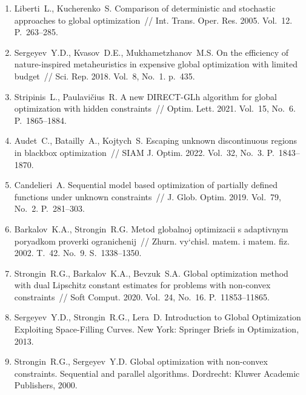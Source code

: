 \documentclass[a4paper,12pt,russian]{article}
\begin{document}
\begin{enumerate}
\item \label{rfa:enlit:Liberti2005}
Liberti~L., Kucherenko~S. Comparison of deterministic and stochastic approaches to global optimization~// Int. Trans. Oper. Res. 2005. Vol.~12. P.~263--285.

\item \label{rfa:enlit:Sergeyev2018}
Sergeyev~Y.D., Kvasov~D.E., Mukhametzhanov~M.S. On the efficiency of nature-inspired metaheuristics in expensive global optimization with limited budget~// Sci. Rep. 2018. Vol.~8, No.~1. p.~435.

\item \label{rfa:enlit:Stripinis2021}
Stripinis~L., Paulavi{\v c}ius~R. A new {DIRECT}-{GLh} algorithm for global optimization with hidden constraints~// Optim. Lett. 2021. Vol.~15, No.~6. P.~1865--1884.

\item \label{rfa:enlit:Audet2022}
Audet~C., Batailly~A., Kojtych~S. Escaping unknown discontinuous regions in blackbox optimization~// SIAM J. Optim. 2022. Vol.~32, No.~3. P.~1843--1870. %

\item \label{rfa:enlit:Candelieri2019}
Candelieri~A. Sequential model based optimization of partially defined functions
under unknown constraints~// J. Glob. Optim. 2019. Vol.~79, No.~2. P.~281--303. %

\item \label{rfa:enlit:Sergeyev2003}
Barkalov~K.A., Strongin~R.G. Metod globalnoj optimizacii s adaptivnym poryadkom proverki ogranichenij~// Zhurn. vy`chisl. matem. i matem. fiz. 2002. T.~42. No.~9. S.~1338--1350.

\item \label{rfa:enlit:Strongin2020}
Strongin~R.G., Barkalov~K.A., Bevzuk~S.A. Global optimization method with dual Lipschitz constant estimates for problems with non-convex constraints~// 
Soft Comput. 2020. Vol.~24, No.~16. P.~11853--11865. %



\item \label{rfa:enlit:Sergeyev2013}
Sergeyev~Y.D., Strongin~R.G., Lera~D. Introduction to Global Optimization Exploiting Space-Filling Curves. New York: Springer Briefs in Optimization, 2013. %

\item \label{rfa:enlit:Strongin2000}
Strongin~R.G., Sergeyev~Y.D. Global optimization with non-convex constraints. Sequential and parallel algorithms. Dordrecht: Kluwer Academic Publishers, 2000.


\end{enumerate}
\end{document}
